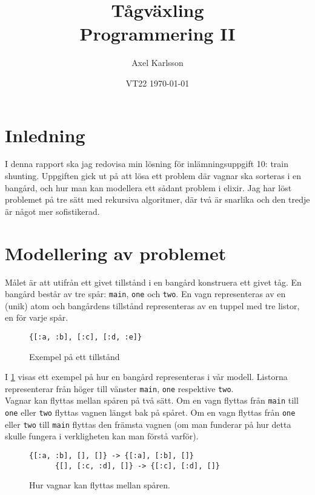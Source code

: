 \documentclass[a4paper,11pt]{article}
\begin{document}
\title{
  \textbf{Tågväxling\\
  \small Programmering II}
}
\author{Axel Karlsson}
\date{VT22 \today}

\maketitle

\section*{Inledning}
I denna rapport ska jag redovisa min lösning för inlämningsuppgift 10: train shunting. Uppgiften gick ut på att lösa ett problem där vagnar ska sorteras i en bangård, och hur man kan modellera ett sådant problem i elixir. Jag har löst problemet på tre sätt med rekursiva algoritmer, där två är snarlika och den tredje är något mer sofistikerad.

\section*{Modellering av problemet}
Målet är att utifrån ett givet tillstånd i en bangård konstruera ett givet tåg. En bangård består av tre spår: {\tt main}, {\tt one} och {\tt two}. En vagn representeras av en (unik) atom och bangårdens tillstånd representeras av en tuppel med tre listor, en för varje spår.

\begin{figure}[H]
  \centering
  \begin{BVerbatim}[gobble=4]
    {[:a, :b], [:c], [:d, :e]}
  \end{BVerbatim}
  \caption{Exempel på ett tillstånd}
  \label{fig:bangard}
\end{figure}

I \ref{fig:bangard} visas ett exempel på hur en bangård representeras i vår modell. Listorna representerar från höger till vänster {\tt main}, {\tt one} respektive {\tt two}.\\

Vagnar kan flyttas mellan spåren på två sätt. Om en vagn flyttas från {\tt main} till {\tt one} eller {\tt two} flyttas vagnen längst bak på spåret. Om en vagn flyttas från {\tt one} eller {\tt two} till {\tt main} flyttas den främsta vagnen (om man funderar på  hur detta skulle fungera i verkligheten kan man förstå varför).

\begin{figure}[H]
  \centering
    \begin{BVerbatim}[gobble=6]
      {[:a, :b], [], []} -> {[:a], [:b], []}
      {[], [:c, :d], []} -> {[:c], [:d], []}
    \end{BVerbatim}
  \caption{Hur vagnar kan flyttas mellan spåren.}
  \label{fig:1.flytta}
\end{figure}
\end{document}
